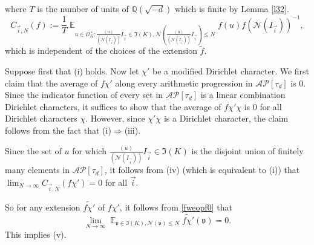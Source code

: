 \documentclass[11pt]{amsart}
\theoremstyle{definition}
\DeclareMathOperator*{\E}{\mathbb{E}}
\newcommand{\NN}{{\mathcal N}}
\newcommand{\Q}{{\mathbb Q}}
\newcommand{\FM}[1]{{\color{violet}{{#1}}}}
\begin{document}
where  $T$ is the number of units of $\Q(\sqrt{-d})$ which is finite by Lemma \ref{l32}.
$$C_{\vec{i},N}(f):=\frac{1}{T}\E_{u\in \mathcal{O}_K^{\times}\colon \frac{(u)}{(\NN(I_{\vec{i}}))}I_{\vec{i}}\in \mathfrak{I}(K), \NN(\frac{(u)}{(\NN(I_{\vec{i}}))}I_{\vec{i}})\leq N} f(u)f(\NN(I_{\vec{i}}))^{-1},$$
which is independent of the choices of the extension $\tilde{f}$.

Suppose first that (i) holds.  Now let $\chi'$ be a modified Dirichlet character. %
We first claim that the average of $f\chi'$ along every arithmetic progression in $\mathcal{AP}[\tau_{d}]$ is 0. Since the indicator function of every set in $\mathcal{AP}[\tau_{d}]$ is a linear combination Dirichlet characters, it suffices to show that the average of $f\chi'\chi$ is 0 for all Dirichlet characters $\chi$. However, since $\chi'\chi$ is a Dirichlet character, the claim follows from the fact that (i)$\Rightarrow$(iii).



Since the set of $u$ for which  $\frac{(u)}{(\NN(I_{\vec{i}}))}I_{\vec{i}}\in \mathfrak{I}(K)$ is the disjoint union of finitely many elements in $\mathcal{AP}[\tau_{d}]$, it follows from (iv) (which is equivalent to (i)) that   $\lim_{N\to\infty}C_{\vec{i},N}(f\chi')=0$ for all $\vec{i}$. 

So for any extension $\widetilde{f\chi'}$ of $f\chi'$, it follows from \eqref{fweopf0} that 
$$\lim_{N\to\infty} \E_{\mathfrak{v}\in \mathfrak{I}(K), \NN(\mathfrak{v})\leq N}\widetilde{f\chi'}(\mathfrak{v})=0.$$
This implies (v).
\end{document}
